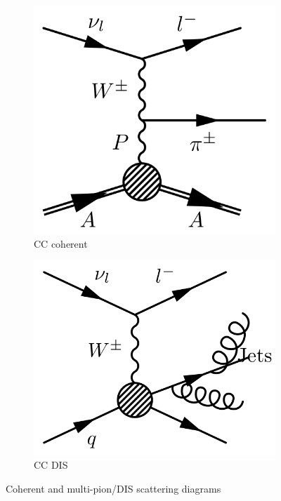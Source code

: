 \begin{figure}[h]
	\centering
	\begin{subfigure}[t]{0.42\textwidth}
		\includegraphics[width=\textwidth, trim={0mm 0mm 0mm 0mm}, clip,page=1]{figures/niwg/diagrams/CCcoh}
		\caption{CC coherent}
		\label{fig:coh_diags}
	\end{subfigure}
	\begin{subfigure}[t]{0.42\textwidth}
		\includegraphics[width=\textwidth, trim={0mm 0mm 0mm 0mm}, clip,page=1]{figures/niwg/diagrams/CCmultipion}
		\caption{CC DIS}
		\label{fig:dis_diags}
	\end{subfigure}
	\caption{Coherent and multi-pion/DIS scattering diagrams}
	\label{fig:coh_dis_diags}
\end{figure}

